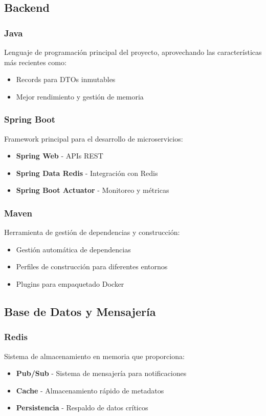 \subsection*{Backend}

\subsubsection*{Java}
Lenguaje de programación principal del proyecto, aprovechando las características más recientes como:
\begin{itemize}
    \item Records para DTOs inmutables
    \item Mejor rendimiento y gestión de memoria
\end{itemize}

\subsubsection*{Spring Boot}
Framework principal para el desarrollo de microservicios:
\begin{itemize}
    \item \textbf{Spring Web} - APIs REST
    \item \textbf{Spring Data Redis} - Integración con Redis
    \item \textbf{Spring Boot Actuator} - Monitoreo y métricas
\end{itemize}

\subsubsection*{Maven}
Herramienta de gestión de dependencias y construcción:
\begin{itemize}
    \item Gestión automática de dependencias
    \item Perfiles de construcción para diferentes entornos
    \item Plugins para empaquetado Docker
\end{itemize}

\subsection*{Base de Datos y Mensajería}

\subsubsection*{Redis}
Sistema de almacenamiento en memoria que proporciona:
\begin{itemize}
    \item \textbf{Pub/Sub} - Sistema de mensajería para notificaciones
    \item \textbf{Cache} - Almacenamiento rápido de metadatos
    \item \textbf{Persistencia} - Respaldo de datos críticos
\end{itemize}

